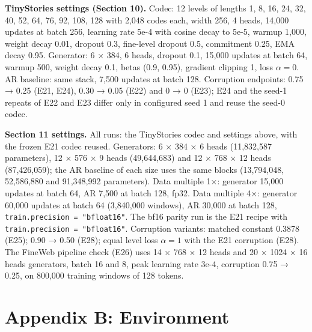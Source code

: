 \documentclass[
  british,
]{article}
\begin{document}
\textbf{TinyStories settings (Section 10).} Codec: 12 levels of lengths
1, 8, 16, 24, 32, 40, 52, 64, 76, 92, 108, 128 with 2,048 codes each,
width 256, 4 heads, 14,000 updates at batch 256, learning rate 5e-4 with
cosine decay to 5e-5, warmup 1,000, weight decay 0.01, dropout 0.3,
fine-level dropout 0.5, commitment 0.25, EMA decay 0.95. Generator: 6 ×
384, 6 heads, dropout 0.1, 15,000 updates at batch 64, warmup 500,
weight decay 0.1, betas (0.9, 0.95), gradient clipping 1, loss
\(\alpha = 0\). AR baseline: same stack, 7,500 updates at batch 128.
Corruption endpoints: 0.75 → 0.25 (E21, E24), 0.30 → 0.05 (E22) and 0 →
0 (E23); E24 and the seed-1 repeats of E22 and E23 differ only in
configured seed 1 and reuse the seed-0 codec.

\textbf{Section 11 settings.} All runs: the TinyStories codec and
settings above, with the frozen E21 codec reused. Generators: 6 × 384 ×
6 heads (11,832,587 parameters), 12 × 576 × 9 heads (49,644,683) and 12
× 768 × 12 heads (87,426,059); the AR baseline of each size uses the
same blocks (13,794,048, 52,586,880 and 91,348,992 parameters). Data
multiple 1×: generator 15,000 updates at batch 64, AR 7,500 at batch
128, fp32. Data multiple 4×: generator 60,000 updates at batch 64
(3,840,000 windows), AR 30,000 at batch 128,
\texttt{train.precision\ =\ "bfloat16"}. The bf16 parity run is the E21
recipe with \texttt{train.precision\ =\ "bfloat16"}. Corruption
variants: matched constant 0.3878 (E25); 0.90 → 0.50 (E28); equal level
loss \(\alpha = 1\) with the E21 corruption (E28). The FineWeb pipeline
check (E26) uses 14 × 768 × 12 heads and 20 × 1024 × 16 heads
generators, batch 16 and 8, peak learning rate 3e-4, corruption 0.75 →
0.25, on 800,000 training windows of 128 tokens.

\section*{Appendix B: Environment}\label{appendix-b-environment}
\end{document}
